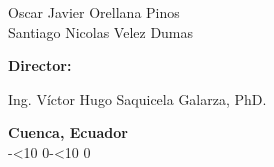 \begin{center}
\begin{flushleft}
        Oscar Javier Orellana Pinos \\

        Santiago Nicolas Velez Dumas \\
        
    \end{flushleft}

    \vspace*{0.1cm}

    \begin{flushleft}
        \singlespacing
        \textbf{Director:}
        
        Ing. Víctor Hugo Saquicela Galarza, PhD. \\
    
    \end{flushleft}
    
    \vspace{2cm}
    \textbf{Cuenca, Ecuador}
    \\
    \number\year-\ifnum\month<10 0\fi\number\month-\ifnum\day<10 0\fi\number\day

\end{center}


\clearpage
